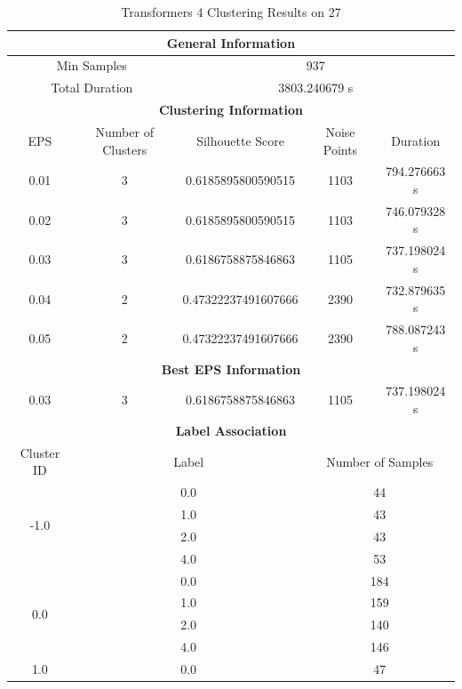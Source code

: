 \begin{longtable}{|c|c|c|c|c|}
\caption{Transformers 4 Clustering Results on 27} \label{tab:27_transformers_4_clustering_results}\\
\hline
\multicolumn{5}{|c|}{\textbf{General Information}} \\
\hline
\multicolumn{2}{|c|}{Min Samples} & \multicolumn{3}{c|}{937} \\
\multicolumn{2}{|c|}{Total Duration} & \multicolumn{3}{c|}{3803.240679 s} \\
\hline
\multicolumn{5}{|c|}{\textbf{Clustering Information}} \\
\hline
EPS & Number of Clusters & Silhouette Score & Noise Points & Duration \\
0.01 & 3 & 0.6185895800590515 & 1103 & 794.276663 s\\
0.02 & 3 & 0.6185895800590515 & 1103 & 746.079328 s\\
0.03 & 3 & 0.6186758875846863 & 1105 & 737.198024 s\\
0.04 & 2 & 0.47322237491607666 & 2390 & 732.879635 s\\
0.05 & 2 & 0.47322237491607666 & 2390 & 788.087243 s\\
\hline
\multicolumn{5}{|c|}{\textbf{Best EPS Information}} \\
\hline
0.03 & 3 & 0.6186758875846863 & 1105 & 737.198024 s\\
\hline
\multicolumn{5}{|c|}{\textbf{Label Association}} \\
\hline
Cluster ID & \multicolumn{2}{c|}{Label} & \multicolumn{2}{c|}{Number of Samples} \\
\hline
\multirow{4}{*}{-1.0} & \multicolumn{2}{c|}{0.0} & \multicolumn{2}{c|}{44} \\
& \multicolumn{2}{c|}{1.0} & \multicolumn{2}{c|}{43} \\
& \multicolumn{2}{c|}{2.0} & \multicolumn{2}{c|}{43} \\
& \multicolumn{2}{c|}{4.0} & \multicolumn{2}{c|}{53} \\
\hline
\multirow{4}{*}{0.0} & \multicolumn{2}{c|}{0.0} & \multicolumn{2}{c|}{184} \\
& \multicolumn{2}{c|}{1.0} & \multicolumn{2}{c|}{159} \\
& \multicolumn{2}{c|}{2.0} & \multicolumn{2}{c|}{140} \\
& \multicolumn{2}{c|}{4.0} & \multicolumn{2}{c|}{146} \\
\hline
\multirow{4}{*}{1.0} & \multicolumn{2}{c|}{0.0} & \multicolumn{2}{c|}{47} \\

\end{longtable}
